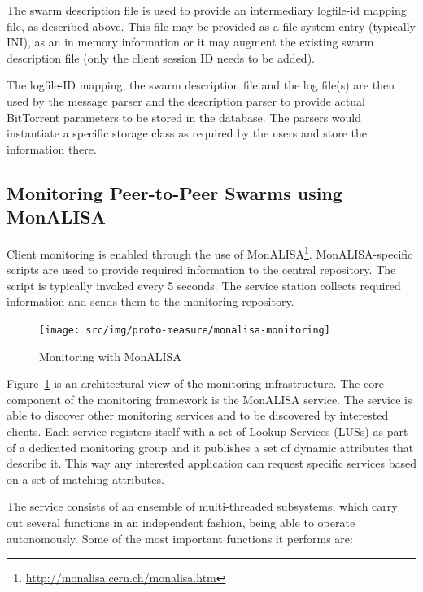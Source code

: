 The swarm description file is used to provide an intermediary logfile-id
mapping file, as described above. This file may be provided as a file system
entry (typically INI), as an in memory information or it may augment the
existing swarm description file (only the client session ID needs to be
added).

The logfile-ID mapping, the swarm description file and the log file(s) are
then used by the message parser and the description parser to provide actual
BitTorrent parameters to be stored in the database. The parsers would
instantiate a specific storage class as required by the users and store the
information there.

\subsection{Monitoring Peer-to-Peer Swarms using MonALISA}

Client monitoring is enabled through the use of
MonALISA\footnote{\url{http://monalisa.cern.ch/monalisa.htm}}. MonALISA-specific
scripts are used to provide required information to the central repository.
The script is typically invoked every 5 seconds. The service station collects
required information and sends them to the monitoring repository.

\begin{figure}[h]
  \begin{center}
    \texttt{[image: src/img/proto-measure/monalisa-monitoring]}
  \end{center}
  \caption{Monitoring with MonALISA}
  \label{fig:proto-measure:monitoring}
\end{figure}

Figure~\ref{fig:proto-measure:monitoring} is an architectural view of the
monitoring infrastructure. The core component of the monitoring framework is
the MonALISA service. The service is able to discover other monitoring
services and to be discovered by interested clients. Each service registers
itself with a set of Lookup Services (LUSs) as part of a dedicated monitoring
group and it publishes a set of dynamic attributes that describe it. This way
any interested application can request specific services based on a set of
matching attributes.

The service consists of an ensemble of multi-threaded subsystems,
which carry out several functions in an independent fashion, being able to
operate autonomously. Some of the most important functions it
performs are:

